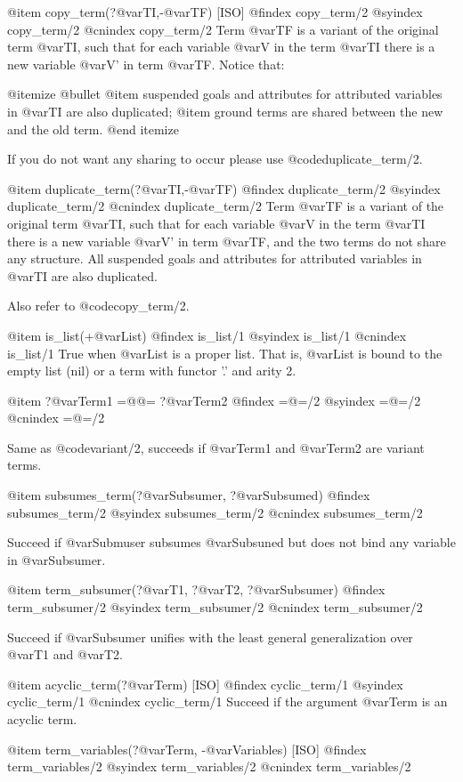 {{{{@item copy_term(?@var{TI},-@var{TF}) [ISO]
@findex copy_term/2
@syindex copy_term/2
@cnindex copy_term/2
Term @var{TF} is a variant of the original term @var{TI}, such that for
each variable @var{V} in the term @var{TI} there is a new variable @var{V'}
in term @var{TF}. Notice that:

@itemize @bullet
@item suspended goals and attributes for attributed variables in
  @var{TI} are also duplicated;
@item ground terms are shared between the new and the old term.
@end itemize

If you do not want any sharing to occur please use
@code{duplicate_term/2}.

@item duplicate_term(?@var{TI},-@var{TF})
@findex duplicate_term/2
@syindex duplicate_term/2
@cnindex duplicate_term/2
Term @var{TF} is a variant of the original term @var{TI}, such that
for each variable @var{V} in the term @var{TI} there is a new variable
@var{V'} in term @var{TF}, and the two terms do not share any
structure. All suspended goals and attributes for attributed variables
in @var{TI} are also duplicated.

Also refer to @code{copy_term/2}.

@item is_list(+@var{List})
@findex is_list/1
@syindex is_list/1
@cnindex is_list/1
True when @var{List} is a proper list. That is, @var{List}
is bound to the empty list (nil) or a term with functor '.' and arity 2.

@item ?@var{Term1} =@@= ?@var{Term2}
@findex  =@=/2
@syindex =@=/2
@cnindex =@=/2

Same as @code{variant/2}, succeeds if @var{Term1} and @var{Term2} are variant terms.


@item subsumes_term(?@var{Subsumer}, ?@var{Subsumed})
@findex  subsumes_term/2
@syindex subsumes_term/2
@cnindex subsumes_term/2

Succeed if @var{Submuser} subsumes @var{Subsuned} but does not bind any
variable in @var{Subsumer}.

@item term_subsumer(?@var{T1}, ?@var{T2}, ?@var{Subsumer})
@findex  term_subsumer/2
@syindex term_subsumer/2
@cnindex term_subsumer/2

Succeed if @var{Subsumer} unifies with the least general
generalization over @var{T1} and
@var{T2}.

@item acyclic_term(?@var{Term}) [ISO]
@findex cyclic_term/1
@syindex cyclic_term/1
@cnindex cyclic_term/1
Succeed if the argument @var{Term} is an acyclic term.

@item term_variables(?@var{Term}, -@var{Variables}) [ISO]
@findex  term_variables/2
@syindex term_variables/2
@cnindex term_variables/2

}}}}
